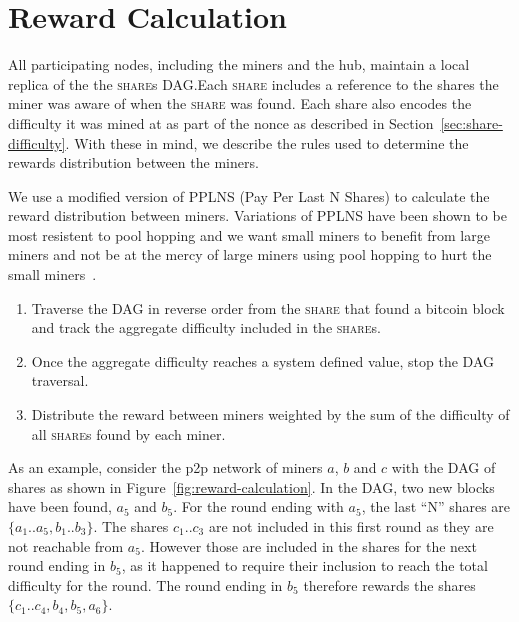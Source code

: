 \documentclass{article}
\begin{document}
\section{Reward Calculation}\label{sec:rewards}

All participating nodes, including the miners and the hub, maintain a
local replica of the the \textsc{share}s DAG.\@ Each \textsc{share}
includes a reference to the shares the miner was aware of when the
\textsc{share} was found. Each share also encodes the difficulty it
was mined at as part of the nonce as described in
Section~\ref{sec:share-difficulty}. With these in mind, we describe
the rules used to determine the rewards distribution between the
miners.

We use a modified version of PPLNS (Pay Per Last N Shares) to
calculate the reward distribution between miners. Variations of PPLNS
have been shown to be most resistent to pool hopping and we want small
miners to benefit from large miners and not be at the mercy of large
miners using pool hopping to hurt the small
miners~\cite{rosenfeld2011analysis}.

\begin{enumerate}
\item Traverse the DAG in reverse order from the \textsc{share} that
  found a bitcoin block and track the aggregate difficulty included in
  the \textsc{share}s.
\item Once the aggregate difficulty reaches a system defined value,
  stop the DAG traversal.
\item Distribute the reward between miners weighted by the sum of the
  difficulty of all \textsc{share}s found by each miner.
\end{enumerate}

As an example, consider the p2p network of miners $a$, $b$ and $c$
with the DAG of shares as shown in
Figure~\ref{fig:reward-calculation}. In the DAG, two new blocks have
been found, $a_5$ and $b_5$. For the round ending with $a_5$, the last
``N'' shares are $\{a_1..a_5, b_1..b_3\}$. The shares $c_1..c_3$ are
not included in this first round as they are not reachable from
$a_5$. However those are included in the shares for the next round
ending in $b_5$, as it happened to require their inclusion to reach
the total difficulty for the round. The round ending in $b_5$
therefore rewards the shares $\{c_1..c_4, b_4, b_5, a_6\}$.
\end{document}
